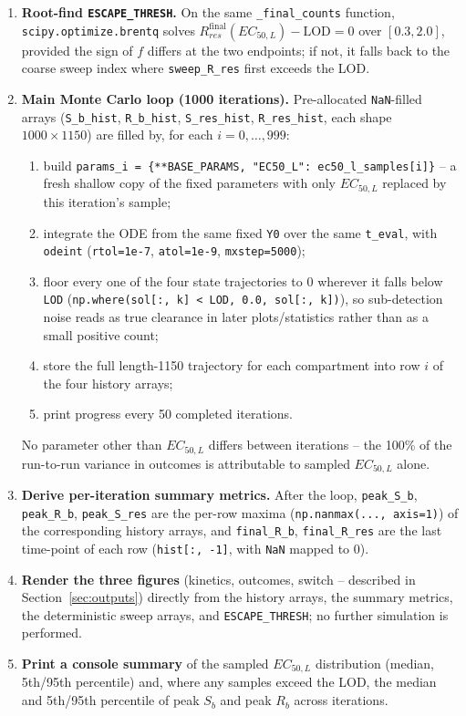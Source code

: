\documentclass[11pt]{article}
\begin{document}
\begin{enumerate}
\item \textbf{Root-find \texttt{ESCAPE\_THRESH}.} On the same
\texttt{\_final\_counts} function, \texttt{scipy.optimize.brentq} solves
$R_{res}^{\mathrm{final}}(EC_{50,L}) - \mathrm{LOD} = 0$ over
$[0.3, 2.0]$, provided the sign of $f$ differs at the two endpoints; if not,
it falls back to the coarse sweep index where \texttt{sweep\_R\_res} first
exceeds the LOD.

\item \textbf{Main Monte Carlo loop (1000 iterations).} Pre-allocated
\texttt{NaN}-filled arrays (\texttt{S\_b\_hist}, \texttt{R\_b\_hist},
\texttt{S\_res\_hist}, \texttt{R\_res\_hist}, each shape
$1000 \times 1150$) are filled by, for each $i = 0, \dots, 999$:
\begin{enumerate}
\item[(a)] build \texttt{params\_i = \{**BASE\_PARAMS, "EC50\_L":
ec50\_l\_samples[i]\}} -- a fresh shallow copy of the fixed parameters with
only $EC_{50,L}$ replaced by this iteration's sample;
\item[(b)] integrate the ODE from the same fixed \texttt{Y0} over the same
\texttt{t\_eval}, with \texttt{odeint} (\texttt{rtol=1e-7},
\texttt{atol=1e-9}, \texttt{mxstep=5000});
\item[(c)] floor every one of the four state trajectories to $0$ wherever
it falls below \texttt{LOD} (\texttt{np.where(sol[:, k] < LOD, 0.0,
sol[:, k])}), so sub-detection noise reads as true clearance in later
plots/statistics rather than as a small positive count;
\item[(d)] store the full length-1150 trajectory for each compartment into
row $i$ of the four history arrays;
\item[(e)] print progress every 50 completed iterations.
\end{enumerate}
No parameter other than $EC_{50,L}$ differs between iterations -- the
100\% of the run-to-run variance in outcomes is attributable to sampled
$EC_{50,L}$ alone.

\item \textbf{Derive per-iteration summary metrics.} After the loop,
\texttt{peak\_S\_b}, \texttt{peak\_R\_b}, \texttt{peak\_S\_res} are the
per-row maxima (\texttt{np.nanmax(..., axis=1)}) of the corresponding
history arrays, and \texttt{final\_R\_b}, \texttt{final\_R\_res} are the
last time-point of each row (\texttt{hist[:, -1]}, with \texttt{NaN}
mapped to $0$).

\item \textbf{Render the three figures} (kinetics, outcomes, switch --
described in Section~\ref{sec:outputs}) directly from the history arrays,
the summary metrics, the deterministic sweep arrays, and
\texttt{ESCAPE\_THRESH}; no further simulation is performed.

\item \textbf{Print a console summary} of the sampled $EC_{50,L}$
distribution (median, 5th/95th percentile) and, where any samples exceed
the LOD, the median and 5th/95th percentile of peak $S_b$ and peak $R_b$
across iterations.
\end{enumerate}
\end{document}
